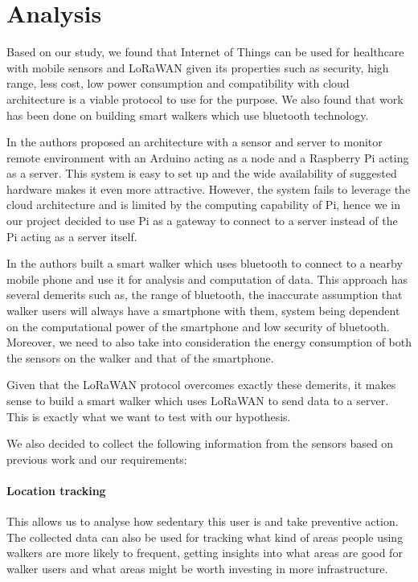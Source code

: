 \chapter{Analysis}
\label{cha:analysis}

Based on our study, we found that Internet of Things can be used for healthcare with mobile sensors and LoRaWAN given its properties such as  security, high range, less cost, low power consumption and compatibility with cloud architecture is a viable protocol to use for the purpose. We also found that work has been done on building smart walkers which use bluetooth technology.

In \cite{erdoush2014wireless} the authors proposed an architecture with a sensor and server to monitor remote environment with an Arduino acting as a node and a Raspberry Pi acting as a server. This system is easy to set up and the wide availability of suggested hardware makes it even more attractive. However, the system fails to leverage the cloud architecture and is limited by the computing capability of Pi, hence we in our project decided to use Pi as a gateway to connect to a server instead of the Pi acting as a server itself.


In \cite{postolache2011smart} the authors built a smart walker which uses bluetooth to connect to a nearby mobile phone and use it for analysis and computation of data. This approach has several demerits such as, the range of bluetooth, the inaccurate assumption that walker users will always have a smartphone with them, system being dependent on the computational power of the smartphone and low security of bluetooth. Moreover, we need to also take into consideration the energy consumption of both the sensors on the walker and that of the smartphone.

Given that the LoRaWAN protocol overcomes exactly these demerits, it makes sense to build a smart walker which uses LoRaWAN to send data to a server.
This is exactly what we want to test with our hypothesis.

We also decided to collect the following information from the sensors based on previous work \cite{postolache2011smart} and our requirements: 

\subsubsection{Location tracking}
This allows us to analyse how sedentary this user is and take preventive action. The collected data can also be used for tracking what kind of areas people using walkers are more likely to frequent, getting insights into what areas are good for walker users and what areas might be worth investing in more infrastructure.

